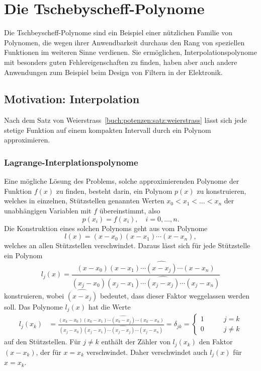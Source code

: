 %
%
%
\section{Die Tschebyscheff-Polynome
\label{buch:polynome:section:tschebyscheff}}
Die Tschbeyscheff-Polynome sind ein Beispiel einer nützlichen Familie
von Polynomen, die wegen ihrer Anwendbarkeit durchaus den Rang von
speziellen Funktionen im weiteren Sinne verdienen.
Sie ermöglichen, Interpolationspolynome mit besonders guten
Fehlereigenschaften zu finden, haben aber auch andere Anwendungen
zum Beispiel beim Design von Filtern in der Elektronik.

\subsection{Motivation: Interpolation}
Nach dem Satz von Weierstrass~\ref{buch:potenzen:satz:weierstrass}
lässt sich jede stetige Funktion auf einem kompakten Intervall durch
ein Polynom approximieren.

\subsubsection{Lagrange-Interplationspolynome}
Eine mögliche Lösung des Problems, solche approximierenden Polynome
der Funktion $f(x)$
zu finden, besteht darin, ein Polynom $p(x)$ zu konstruieren, welches
in einzelnen, Stützstellen genannten Werten $x_0<x_1<\dots<x_n$ der
unabhängigen Variablen mit $f$ übereinstimmt, also
\[
p(x_i) = f(x_i), \quad i=0,\dots,n.
\]
Die Konstruktion eines solchen Polynoms geht aus vom Polynome
\[
l(x) = (x-x_0)(x-x_1)\cdots(x-x_n),
\]
welches an allen Stützstellen verschwindet.
Daraus lässt sich für jede Stützstelle ein Polynom
\[
l_j(x)
=
\frac{
(x-x_0)(x-x_1)\cdots\widehat{(x-x_j)}\cdots(x-x_n)
}{
(x_j-x_0)(x_j-x_1)\cdots\widehat{(x_j-x_j)}\cdots(x_j-x_n)
}
\]
konstruieren, wobei $\widehat{(x-x_j)}$ bedeutet, dass dieser Faktor
weggelassen werden soll.
Das Polynome $l_j(x)$ hat die Werte
\begin{align}
l_j(x_k)
&=
\frac{
(x_k-x_0)(x_k-x_1)\cdots\widehat{(x_k-x_j)}\cdots(x_k-x_n)
}{
(x_j-x_0)(x_j-x_1)\cdots\widehat{(x_j-x_j)}\cdots(x_j-x_n)
}
=
\delta_{jk}
=
\begin{cases}
1&\qquad j=k\\
0&\qquad j\ne k
\end{cases}
\label{buch:potenzen:interpolation:lj}
\end{align}
auf den Stützstellen.
Für $j\ne k$ enthält der Zähler von $l_j(x_k)$ den Faktor
$(x-x_k)$, der für $x=x_k$ verschwindet.
Daher verschwindet auch $l_j(x)$ für $x=x_k$.

